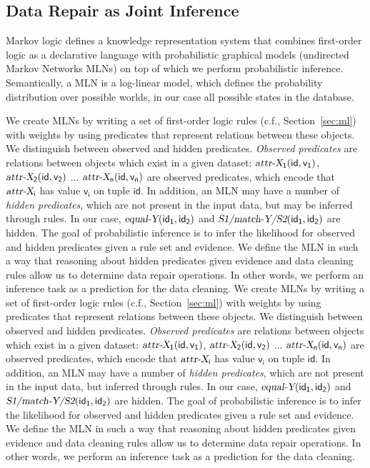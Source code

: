 \subsection{Data Repair as Joint Inference}
\label{subsec:jointinference}
Markov logic defines a knowledge representation system that combines first-order logic as a declarative language with probabilistic graphical models (undirected Markov Networks MLNs) on top of which we perform probabilistic inference. Semantically, a MLN is a log-linear model, which defines the probability distribution over possible worlds, in our case all possible states in the database.

We create MLNs by writing a set of first-order logic rules (c.f., Section~\ref{sec:ml}) with weights by using predicates that represent relations between these objects. We distinguish between observed and hidden predicates. \textit{Observed predicates} are relations between objects which exist in a given dataset: $\mathsf{\textsl{attr-X}_1(id,v_1)}$, $\mathsf{\textsl{attr-X}_2(id,v_2)}$ $\dots$ $\mathsf{\textsl{attr-X}_n(id,v_n)}$ are observed predicates, which encode that $\mathsf{\textsl{attr-X}_i}$ has value $\mathsf{v_i}$ on tuple $\mathsf{id}$. In addition, an MLN may have a number of \textit{hidden predicates}, which are not present in the input data, but may be inferred through rules. In our case, $\mathsf{\textsl{equal-Y}(id_1, id_2)}$ and $\mathsf{\textsl{S1/match-Y/S2}(id_1, id_2)}$ are hidden.  The goal of probabilistic inference is to infer the likelihood for observed and hidden predicates given a rule set and evidence. We define the MLN in such a way that reasoning about hidden predicates given evidence and data cleaning rules allow us to determine data repair operations. In other words, we perform an inference task as a prediction for the data cleaning.
We create MLNs by writing a set of first-order logic rules (c.f., Section~\ref{sec:ml}) with weights by using predicates that represent relations between these objects. We distinguish between observed and hidden predicates. \textit{Observed predicates} are relations between objects which exist in a given dataset: $\mathsf{\textsl{attr-X}_1(id,v_1)}$, $\mathsf{\textsl{attr-X}_2(id,v_2)}$ $\dots$ $\mathsf{\textsl{attr-X}_n(id,v_n)}$ are observed predicates, which encode that $\mathsf{\textsl{attr-X}_i}$ has value $\mathsf{v_i}$ on tuple $\mathsf{id}$. In addition, an MLN may have a number of \textit{hidden predicates}, which are not present in the input data, but inferred through rules. In our case, $\mathsf{\textsl{equal-Y}(id_1, id_2)}$ and $\mathsf{\textsl{S1/match-Y/S2}(id_1, id_2)}$ are hidden.  The goal of probabilistic inference is to infer the likelihood for observed and hidden predicates given a rule set and evidence. We define the MLN in such a way that reasoning about hidden predicates given evidence and data cleaning rules allow us to determine data repair operations. In other words, we perform an inference task as a prediction for the data cleaning.

